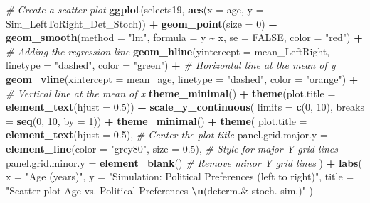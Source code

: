 \documentclass[
]{book}
\newenvironment{Shaded}{\begin{snugshade}}{\end{snugshade}}
\newcommand{\AttributeTok}[1]{\textcolor[rgb]{0.13,0.29,0.53}{#1}}
\newcommand{\CommentTok}[1]{\textcolor[rgb]{0.56,0.35,0.01}{\textit{#1}}}
\newcommand{\ConstantTok}[1]{\textcolor[rgb]{0.56,0.35,0.01}{#1}}
\newcommand{\DecValTok}[1]{\textcolor[rgb]{0.00,0.00,0.81}{#1}}
\newcommand{\FloatTok}[1]{\textcolor[rgb]{0.00,0.00,0.81}{#1}}
\newcommand{\FunctionTok}[1]{\textcolor[rgb]{0.13,0.29,0.53}{\textbf{#1}}}
\newcommand{\NormalTok}[1]{#1}
\newcommand{\SpecialCharTok}[1]{\textcolor[rgb]{0.81,0.36,0.00}{\textbf{#1}}}
\newcommand{\StringTok}[1]{\textcolor[rgb]{0.31,0.60,0.02}{#1}}
\begin{document}
\begin{Shaded}
\begin{Highlighting}[]
\CommentTok{\# Create a scatter plot}
\FunctionTok{ggplot}\NormalTok{(selects19, }\FunctionTok{aes}\NormalTok{(}\AttributeTok{x =}\NormalTok{ age, }\AttributeTok{y =}\NormalTok{ Sim\_LeftToRight\_Det\_Stoch)) }\SpecialCharTok{+}
  \FunctionTok{geom\_point}\NormalTok{(}\AttributeTok{size =} \DecValTok{0}\NormalTok{) }\SpecialCharTok{+}
  \FunctionTok{geom\_smooth}\NormalTok{(}\AttributeTok{method =} \StringTok{"lm"}\NormalTok{, }\AttributeTok{formula =}\NormalTok{ y }\SpecialCharTok{\textasciitilde{}}\NormalTok{ x, }\AttributeTok{se =} \ConstantTok{FALSE}\NormalTok{, }\AttributeTok{color =} \StringTok{"red"}\NormalTok{) }\SpecialCharTok{+}  \CommentTok{\# Adding the regression line}
  \FunctionTok{geom\_hline}\NormalTok{(}\AttributeTok{yintercept =}\NormalTok{ mean\_LeftRight, }\AttributeTok{linetype =} \StringTok{"dashed"}\NormalTok{, }\AttributeTok{color =} \StringTok{"green"}\NormalTok{) }\SpecialCharTok{+}  \CommentTok{\# Horizontal line at the mean of y}
  \FunctionTok{geom\_vline}\NormalTok{(}\AttributeTok{xintercept =}\NormalTok{ mean\_age, }\AttributeTok{linetype =} \StringTok{"dashed"}\NormalTok{, }\AttributeTok{color =} \StringTok{"orange"}\NormalTok{) }\SpecialCharTok{+}  \CommentTok{\# Vertical line at the mean of x}
  \FunctionTok{theme\_minimal}\NormalTok{() }\SpecialCharTok{+}
  \FunctionTok{theme}\NormalTok{(}\AttributeTok{plot.title =} \FunctionTok{element\_text}\NormalTok{(}\AttributeTok{hjust =} \FloatTok{0.5}\NormalTok{)) }\SpecialCharTok{+}
  \FunctionTok{scale\_y\_continuous}\NormalTok{(}
    \AttributeTok{limits =} \FunctionTok{c}\NormalTok{(}\DecValTok{0}\NormalTok{, }\DecValTok{10}\NormalTok{),}
    \AttributeTok{breaks =} \FunctionTok{seq}\NormalTok{(}\DecValTok{0}\NormalTok{, }\DecValTok{10}\NormalTok{, }\AttributeTok{by =} \DecValTok{1}\NormalTok{)) }\SpecialCharTok{+}
  \FunctionTok{theme\_minimal}\NormalTok{() }\SpecialCharTok{+}
  \FunctionTok{theme}\NormalTok{(}
    \AttributeTok{plot.title =} \FunctionTok{element\_text}\NormalTok{(}\AttributeTok{hjust =} \FloatTok{0.5}\NormalTok{), }\CommentTok{\# Center the plot title}
    \AttributeTok{panel.grid.major.y =} \FunctionTok{element\_line}\NormalTok{(}\AttributeTok{color =} \StringTok{"grey80"}\NormalTok{, }\AttributeTok{size =} \FloatTok{0.5}\NormalTok{), }\CommentTok{\# Style for major Y grid lines}
    \AttributeTok{panel.grid.minor.y =} \FunctionTok{element\_blank}\NormalTok{() }\CommentTok{\# Remove minor Y grid lines}
\NormalTok{  ) }\SpecialCharTok{+}
  \FunctionTok{labs}\NormalTok{(}
    \AttributeTok{x =} \StringTok{"Age (years)"}\NormalTok{,}
    \AttributeTok{y =} \StringTok{"Simulation: Political Preferences (left to right)"}\NormalTok{,}
    \AttributeTok{title =} \StringTok{"Scatter plot Age vs. Political Preferences }\SpecialCharTok{\textbackslash{}n}\StringTok{(determ.\& stoch. sim.)"}
\NormalTok{  )}
\end{Highlighting}
\end{Shaded}
\end{document}
